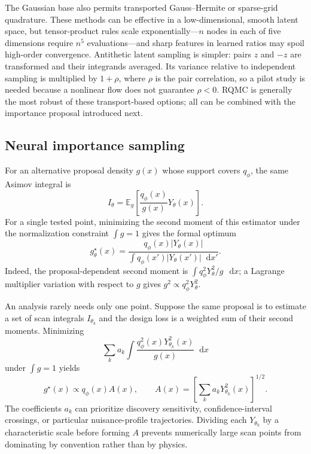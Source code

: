\documentclass[
  aps,
  prd,
  superscriptaddress,
  nofootinbib,
  longbibliography,
  12pt
]{revtex4-2}
\newcommand{\dd}{\mathop{}\!\mathrm{d}}
\newcommand{\E}{\mathbb{E}}
\newcommand{\qRef}{q_{\phi}}
\begin{document}
The Gaussian base also permits transported Gauss--Hermite or sparse-grid quadrature.  These methods can be effective in a low-dimensional, smooth latent space, but tensor-product rules scale exponentially---$n$ nodes in each of five dimensions require $n^5$ evaluations---and sharp features in learned ratios may spoil high-order convergence.  Antithetic latent sampling is simpler: pairs $z$ and $-z$ are transformed and their integrands averaged.  Its variance relative to independent sampling is multiplied by $1+\rho$, where $\rho$ is the pair correlation, so a pilot study is needed because a nonlinear flow does not guarantee $\rho<0$.  RQMC is generally the most robust of these transport-based options; all can be combined with the importance proposal introduced next.

\subsection{Neural importance sampling}
\label{sec:nis}

For an alternative proposal density $g(x)$ whose support covers $\qRef$, the same Asimov integral is
\begin{equation}
  I_\theta
  =\E_g\!\left[
  \frac{\qRef(x)}{g(x)}Y_\theta(x)
  \right].
  \label{eq:asimov-importance}
\end{equation}
For a single tested point, minimizing the second moment of this estimator under the normalization constraint $\int g=1$ gives the formal optimum
\begin{equation}
  g_\theta^\star(x)
  =\frac{\qRef(x)|Y_\theta(x)|}
  {\int\qRef(x')|Y_\theta(x')|\dd x'}.
  \label{eq:optimal-point-proposal}
\end{equation}
Indeed, the proposal-dependent second moment is $\int q_\phi^2Y_\theta^2/g\,\dd x$; a Lagrange multiplier variation with respect to $g$ gives $g^2\propto q_\phi^2Y_\theta^2$.

An analysis rarely needs only one point.  Suppose the same proposal is to estimate a set of scan integrals $I_{\theta_k}$ and the design loss is a weighted sum of their second moments.  Minimizing
\begin{equation}
  \sum_k a_k\int
  \frac{q_\phi^2(x)Y_{\theta_k}^2(x)}{g(x)}\dd x
\end{equation}
under $\int g=1$ yields
\begin{equation}
  g^\star(x)\propto\qRef(x)A(x),
  \qquad
  A(x)=\left[\sum_k a_kY_{\theta_k}^2(x)\right]^{1/2}.
  \label{eq:optimal-scan-proposal}
\end{equation}
The coefficients $a_k$ can prioritize discovery sensitivity, confidence-interval crossings, or particular nuisance-profile trajectories.  Dividing each $Y_{\theta_k}$ by a characteristic scale before forming $A$ prevents numerically large scan points from dominating by convention rather than by physics.
\end{document}
